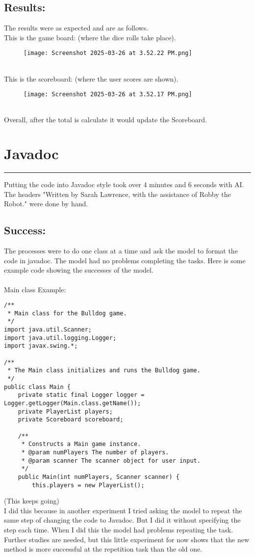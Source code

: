 \documentclass[a4paper,11pt]{article}
\begin{document}
\subsection*{Results:}
The results were as expected and are as follows.\\
This is the game board: (where the dice rolls take place).
\begin{figure}[h] 
    \centering
    \texttt{[image: Screenshot 2025-03-26 at 3.52.22 PM.png]}
    \label{fig:first}
\end{figure}\\
This is the scoreboard: (where the user scores are shown).
\begin{figure}[h] 
    \centering
    \texttt{[image: Screenshot 2025-03-26 at 3.52.17 PM.png]}
    \label{fig:first}
\end{figure}\\
Overall, after the total is calculate it would update the Scoreboard. 

\section*{Javadoc}
\hrule
\vspace{10pt} 
Putting the code into Javadoc style took over 4 minutes and 6 seconds with AI. The headers "Written by Sarah Lawrence, with the assistance of Robby the Robot." were done by hand. 
\vspace{5pt}
\subsection*{Success:}
The processes were to do one class at a time and ask the model to format the code in javadoc. The model had no problems completing the tasks. Here is some example code showing the successes of the model.\\\\
Main class Example:
\begin{lstlisting}
/**
 * Main class for the Bulldog game.
 */
import java.util.Scanner;
import java.util.logging.Logger;
import javax.swing.*;

/**
 * The Main class initializes and runs the Bulldog game.
 */
public class Main {
    private static final Logger logger = Logger.getLogger(Main.class.getName());
    private PlayerList players;
    private Scoreboard scoreboard;

    /**
     * Constructs a Main game instance.
     * @param numPlayers The number of players.
     * @param scanner The scanner object for user input.
     */
    public Main(int numPlayers, Scanner scanner) {
        this.players = new PlayerList();
\end{lstlisting} (This keeps going)\\
I did this because in another experiment I tried asking the model to repeat the same step of changing the code to Javadoc. But I did it without specifying the step each time. When I did this the model had problems repeating the task. Further studies are needed, but this little experiment for now shows that the new method is more successful at the repetition task than the old one.
\end{document}
